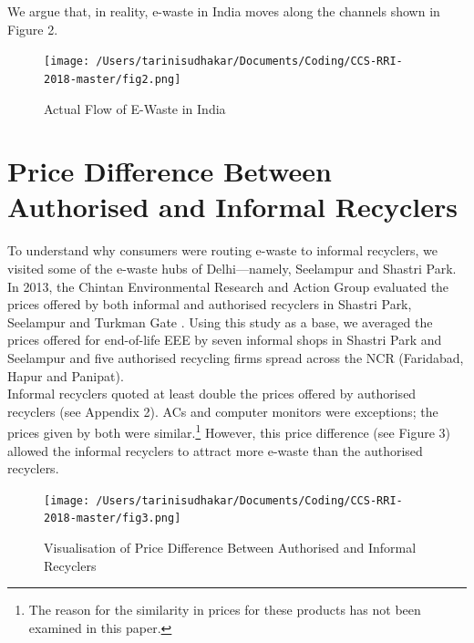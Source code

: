 \documentclass[a4paper, 12pt]{article}
\begin{document}
                    We argue that, in reality, e-waste in India moves along the channels shown in Figure 2. \\
                    
                    \begin{figure}[H]
                    	\centering
                    	\texttt{[image: /Users/tarinisudhakar/Documents/Coding/CCS-RRI-2018-master/fig2.png]}
                    	\caption[Optional Caption]{Actual Flow of E-Waste in India}
                    \end{figure}
                    
                    \section{Price Difference Between Authorised and Informal Recyclers}\label{sec:3}
                    
                    To understand why consumers were routing e-waste to informal recyclers, we visited some of the e-waste hubs of Delhi—namely, Seelampur and Shastri Park.\\
                     
                     In 2013, the Chintan Environmental Research and Action Group evaluated the prices offered by both informal and authorised recyclers in Shastri Park, Seelampur and Turkman Gate \parencite{chintanreport}. Using this study as a base, we averaged the prices offered for end-of-life EEE by seven informal shops in Shastri Park and Seelampur and five authorised recycling firms spread across the NCR (Faridabad, Hapur and Panipat).\\
                     
                     Informal recyclers quoted at least double the prices offered by authorised recyclers (see Appendix 2). ACs and computer monitors were exceptions; the prices given by both were similar.\footnote{The reason for the similarity in prices for these products has not been examined in this paper.} However, this price difference (see Figure 3) allowed the informal recyclers to attract more e-waste than the authorised recyclers. \\
                                        
                    \begin{figure}[H]
                    \flushleft
                    \texttt{[image: /Users/tarinisudhakar/Documents/Coding/CCS-RRI-2018-master/fig3.png]}
                    \caption[Optional Caption]{Visualisation of Price Difference Between Authorised and Informal Recyclers}
                    \end{figure}
                    
\end{document}
